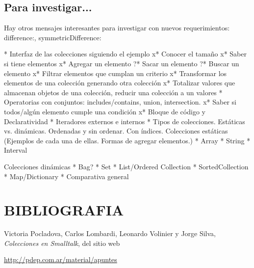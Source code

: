 \documentclass[a4paper,12pt]{book}
\begin{document}
\subsection{Para investigar...}
Hay otros mensajes interesantes para investigar con nuevos requerimientos: difference:, symmetricDifference:

* Interfaz de las colecciones siguiendo el ejemplo
  x* Conocer el tamaño
  x* Saber si tiene elementos
  x* Agregar un elemento
  ?* Sacar un elemento
  ?* Buscar un elemento
  x* Filtrar elementos que cumplan un criterio
  x* Transformar los elementos de una colección generando otra colección
  x* Totalizar valores que almacenan objetos de una colección, reducir una colección a un valores
  * Operatorias con conjuntos: includes/contains, union, intersection.
  x* Saber si todos/algún elemento cumple una condición
  x* Bloque de código y Declaratividad
* Iteradores externos e internos
* Tipos de colecciones. Estáticas vs. dinámicas. Ordenadas y sin ordenar. Con índices.
  Colecciones estáticas (Ejemplos de cada una de ellas. Formas de agregar elementos.)
  * Array
  * String
  * Interval
  
  Colecciones dinámicas
  * Bag?
  * Set
  * List/Ordered Collection
  * SortedCollection
  * Map/Dictionary
  * Comparativa general


\section{BIBLIOGRAFIA}

Victoria Pocladova, Carlos Lombardi, Leonardo Volinier y Jorge Silva, \textit{Colecciones en Smalltalk}, 
 del sitio web \\
\begin{minipage}[t]{0.5\textwidth}
     \href{http://pdep.com.ar/material/apuntes}{{\color{blue}http://pdep.com.ar/material/apuntes}}
\end{minipage}
  
  
\end{document}
